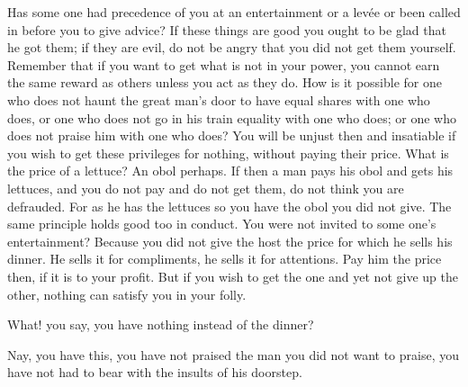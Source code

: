 Has some  one had precedence  of you  at an entertainment  or a levée  or been
called in before you  to give advice? If these things are good  you ought to be
glad that he got them;  if they are evil, do not be angry  that you did not get
them yourself. Remember that if you want to  get what is not in your power, you
cannot earn  the same reward  as others unless  you act as  they do. How  is it
possible for one who  does not haunt the great man's door  to have equal shares
with one who  does, or one who does  not go in his train equality  with one who
does; or one who does not praise him with one who does? You will be unjust then
and insatiable if you wish to  get these privileges for nothing, without paying
their price.  What is the price  of a lettuce? An  obol perhaps. If then  a man
pays his obol and gets his lettuces, and you do not pay and do not get them, do
not think you  are defrauded. For as he  has the lettuces so you  have the obol
you did not  give. The same principle  holds good too in conduct.  You were not
invited to  some one's  entertainment? Because  you did not  give the  host the
price for which he  sells his dinner. He sells it for  compliments, he sells it
for attentions.  Pay him the price  then, if it is  to your profit. But  if you
wish to get the  one and yet not give up the other,  nothing can satisfy you in
your folly.

What! you say, you have nothing instead of the dinner?

Nay, you have  this, you have not praised  the man you did not  want to praise,
you have not had to bear with the insults of his doorstep.
